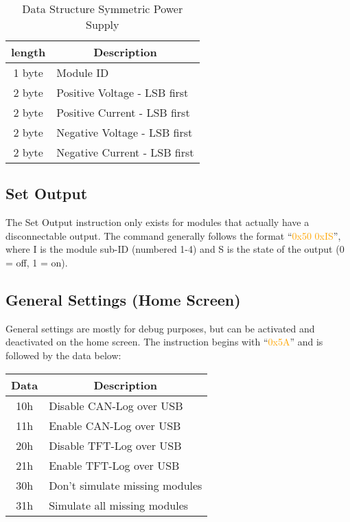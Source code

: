 \begin{table}[H]
    \centering
    \begin{tabular}{|c|l|}
        \hline
        \textbf{length}  & \multicolumn{1}{|c|}{\textbf{Description}}\\ \hline \hline
        1 byte & Module ID\\ \hline
        2 byte & Positive Voltage - LSB first \\ \hline
        2 byte & Positive Current - LSB first \\ \hline
        2 byte & Negative Voltage - LSB first \\ \hline
        2 byte & Negative Current - LSB first \\ \hline
    \end{tabular}
\caption[Data Structure Symmetric Power Supply]{Data Structure Symmetric Power Supply}
\label{tab:tft_sympsu_5C}
\end{table}

\subsection{Set Output}
The Set Output instruction only exists for modules that actually have a disconnectable output. The command generally follows the format ``\textcolor{orange}{0x50 0xIS}'', where I is the module sub-ID (numbered 1-4) and S is the state of the output (0 = off, 1 = on). 

\subsection{General Settings (Home Screen)}
General settings are mostly for debug purposes, but can be activated and deactivated on the home screen. The instruction begins with ``\textcolor{orange}{0x5A}'' and is followed by the data below:

\begin{table}[H]
    \centering
    \begin{tabular}{|c|l|}
        \hline
        \textbf{Data}  & \multicolumn{1}{|c|}{\textbf{Description}}\\ \hline \hline
        10h & Disable CAN-Log over USB \\ \hline
        11h & Enable CAN-Log over USB \\ \hline
        20h & Disable TFT-Log over USB \\ \hline
        21h & Enable TFT-Log over USB \\ \hline
        30h & Don't simulate missing modules \\ \hline
        31h & Simulate all missing modules \\ \hline
    \end{tabular}
\label{tab:tft_5A}
\end{table}